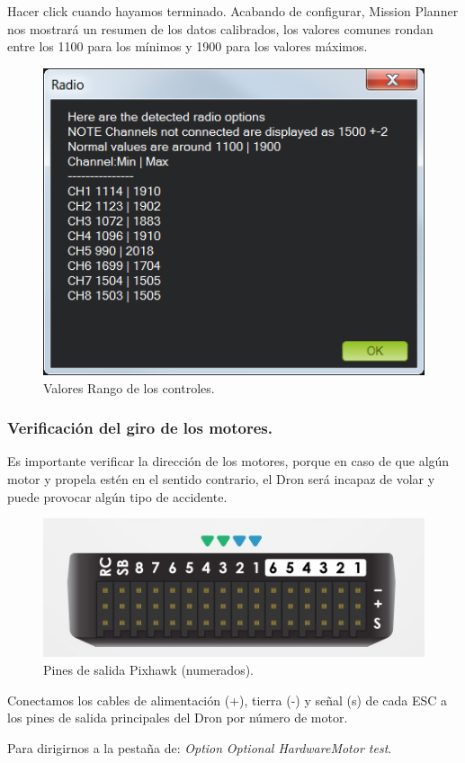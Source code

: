 Hacer click cuando hayamos terminado. Acabando de configurar, Mission Planner nos mostrará un resumen de los datos calibrados, los valores comunes rondan entre los 1100 para los mínimos y 1900 para los valores máximos.

\begin{figure}[H]
	\centering
	\includegraphics[width=0.5\linewidth]{imagenes/rangos}
	\caption{Valores Rango de los controles.}
	\label{fig:rangos}
\end{figure}

\subsubsection{Verificación del giro de los motores.}

Es importante verificar la dirección de los motores, porque en caso de que algún motor y propela estén en el sentido contrario, el Dron será incapaz de volar y puede provocar algún tipo de accidente.
\begin{figure}[H]
	\centering
	\includegraphics[width=0.7\linewidth]{imagenes/pixhawkIn}
	\caption{Pines de salida Pixhawk (numerados).}
	\label{fig:pixhawkin}
\end{figure} 

Conectamos los cables de alimentación (+), tierra (-) y señal (s) de cada ESC a los pines de salida principales del Dron por número de motor.

Para dirigirnos a la pestaña de:
\textit{Option}\textrightarrow\textit{ Optional Hardware}\textrightarrow \textit{Motor test}.


